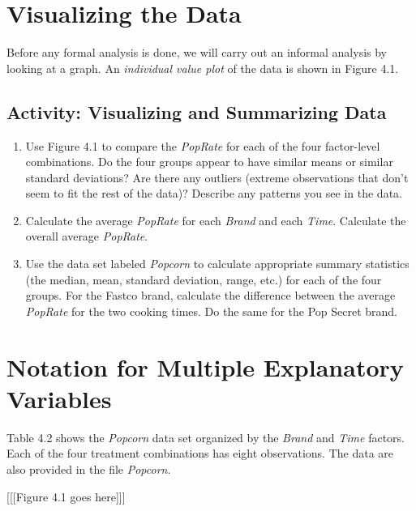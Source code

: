 \documentclass[
]{report}
\providecommand{\tightlist}{%
  \setlength{\itemsep}{0pt}\setlength{\parskip}{0pt}}
\begin{document}
\section{Visualizing the Data}\label{visualizing-the-data}

Before any formal analysis is done, we will carry out an informal analysis by looking at a graph. An \emph{individual value plot} of the data is shown in Figure 4.1.

\subsection{Activity: Visualizing and Summarizing Data}\label{activity-visualizing-and-summarizing-data}

\begin{enumerate}
\def\labelenumi{\arabic{enumi}.}
\setcounter{enumi}{2}
\tightlist
\item
  Use Figure 4.1 to compare the \emph{PopRate} for each of the four factor-level combinations. Do the four groups appear to have similar means or similar standard deviations? Are there any outliers (extreme observations that don't seem to fit the rest of the data)? Describe any patterns you see in the data.\\
\item
  Calculate the average \emph{PopRate} for each \emph{Brand} and each \emph{Time}. Calculate the overall average \emph{PopRate}.\\
\item
  Use the data set labeled \emph{Popcorn} to calculate appropriate summary statistics (the median, mean, standard deviation, range, etc.) for each of the four groups. For the Fastco brand, calculate the difference between the average \emph{PopRate} for the two cooking times. Do the same for the Pop Secret brand.
\end{enumerate}

\section{Notation for Multiple Explanatory Variables}\label{notation-for-multiple-explanatory-variables}

Table 4.2 shows the \emph{Popcorn} data set organized by the \emph{Brand} and \emph{Time} factors. Each of the four treatment combinations has eight observations. The data are also provided in the file \emph{Popcorn}.

{[}{[}{[}Figure 4.1 goes here{]}{]}{]}
\end{document}
